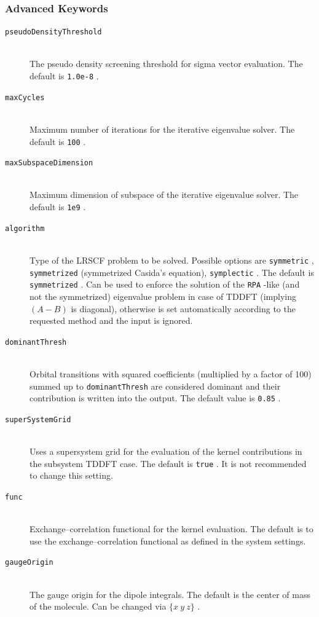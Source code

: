 \documentclass[bibliography=totocnumbered,a4paper,10pt,oneside]{scrbook}
\newcommand{\ttt}[1]{%
  \begingroup\setlength{\fboxsep}{1pt}%
  \colorbox{serenity-green!30}{\texttt{\hspace*{2pt}\vphantom{(g}#1\hspace*{2pt}}}%
  \endgroup
}
\begin{document}
\subsubsection{Advanced Keywords}
\begin{description}
    \item [\texttt{pseudoDensityThreshold}]\hfill \\
    The pseudo density screening threshold for sigma vector evaluation. The default is \ttt{1.0e-8}.
    \item [\texttt{maxCycles}]\hfill \\
    Maximum number of iterations for the iterative eigenvalue solver. The default is \ttt{100}.
    \item [\texttt{maxSubspaceDimension}]\hfill \\
    Maximum dimension of subspace of the iterative eigenvalue solver. The default is \ttt{1e9}.
    \item [\texttt{algorithm}]\hfill \\
    Type of the LRSCF problem to be solved. Possible options are \ttt{symmetric}, \ttt{symmetrized} (symmetrized Casida's equation), \ttt{symplectic}. The default is \ttt{symmetrized}. Can be used to enforce the solution of the \ttt{RPA}-like (and not the symmetrized) eigenvalue problem in case of TDDFT (implying $(A-B)$ is diagonal), otherwise is set automatically according to the requested method and the input is ignored.
    \item [\texttt{dominantThresh}]\hfill \\
    Orbital transitions with squared coefficients (multiplied by a factor of 100) summed up to \ttt{dominantThresh} are considered dominant and their contribution is written into the output. The default value is \ttt{0.85}.
    \item [\texttt{superSystemGrid}]\hfill \\
    Uses a supersystem grid for the evaluation of the kernel contributions in the subsystem TDDFT case. The default is \ttt{true}. It is not recommended to change this setting.
    \item [\texttt{func}]\hfill \\
    Exchange--correlation functional for the kernel evaluation. The default is to use the exchange--correlation functional as defined in the system settings.
    \item [\texttt{gaugeOrigin}]\hfill \\
    The gauge origin for the dipole integrals. The default is the center of mass of the molecule. Can be changed via \ttt{$\{x~y~z\}$}.

\end{description}
\end{document}
